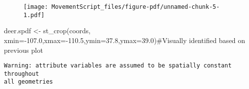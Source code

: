 \documentclass[
  letterpaper,
]{book}
\newenvironment{Shaded}{\begin{snugshade}}{\end{snugshade}}
\newcommand{\AttributeTok}[1]{\textcolor[rgb]{0.40,0.45,0.13}{#1}}
\newcommand{\CommentTok}[1]{\textcolor[rgb]{0.37,0.37,0.37}{#1}}
\newcommand{\DecValTok}[1]{\textcolor[rgb]{0.68,0.00,0.00}{#1}}
\newcommand{\FloatTok}[1]{\textcolor[rgb]{0.68,0.00,0.00}{#1}}
\newcommand{\FunctionTok}[1]{\textcolor[rgb]{0.28,0.35,0.67}{#1}}
\newcommand{\NormalTok}[1]{\textcolor[rgb]{0.00,0.23,0.31}{#1}}
\newcommand{\OtherTok}[1]{\textcolor[rgb]{0.00,0.23,0.31}{#1}}
\newcommand{\SpecialCharTok}[1]{\textcolor[rgb]{0.37,0.37,0.37}{#1}}
\newcommand{\StringTok}[1]{\textcolor[rgb]{0.13,0.47,0.30}{#1}}
\begin{document}
\begin{Shaded}
\end{Shaded}

\begin{figure}[H]

{\centering \texttt{[image: MovementScript\_files/figure-pdf/unnamed-chunk-5-1.pdf]}

}

\end{figure}

\begin{Shaded}
\begin{Highlighting}[]
\NormalTok{deer.spdf }\OtherTok{\textless{}{-}} \FunctionTok{st\_crop}\NormalTok{(coords, }\AttributeTok{xmin=}\SpecialCharTok{{-}}\FloatTok{107.0}\NormalTok{,}\AttributeTok{xmax=}\SpecialCharTok{{-}}\FloatTok{110.5}\NormalTok{,}\AttributeTok{ymin=}\FloatTok{37.8}\NormalTok{,}\AttributeTok{ymax=}\FloatTok{39.0}\NormalTok{)}\CommentTok{\#Visually identified based on previous plot}
\end{Highlighting}
\end{Shaded}

\begin{verbatim}
Warning: attribute variables are assumed to be spatially constant throughout
all geometries
\end{verbatim}
\end{document}
